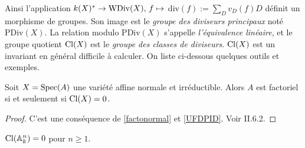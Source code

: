 Ainsi l'application $k(X)^*\rightarrow \operatorname{WDiv}(X),\, f\mapsto $ div$(f):=\sum_D v_D(f)D$ définit un morphisme de groupes. Son image est le \textit{groupe des diviseurs principaux} noté PDiv$(X)$. La relation modulo PDiv$(X)$ s'appelle \textit{l'équivalence linéaire}, et le groupe quotient $\operatorname{Cl}(X)$ est le \textit{groupe des classes de diviseurs}. $\operatorname{Cl}(X)$ est un invariant en général difficile à calculer. On liste ci-dessous quelques outils et exemples.


\begin{prop}\label{AffUFDClgTrifial}
Soit $X=\operatorname{Spec}(A)$ une variété affine normale et irréductible. Alors $A$ est factoriel si et seulement si $\operatorname{Cl}(X)=0$.
\end{prop}
\begin{proof}
C'est une conséquence de \ref{factonormal} et \ref{UFDPID}. Voir \cite{Hartshorne} II.6.2.
\end{proof}

\begin{cor}
$\operatorname{Cl}(\mathbb{A} ^n_k)=0$ pour $n\geq 1$.
\end{cor}

